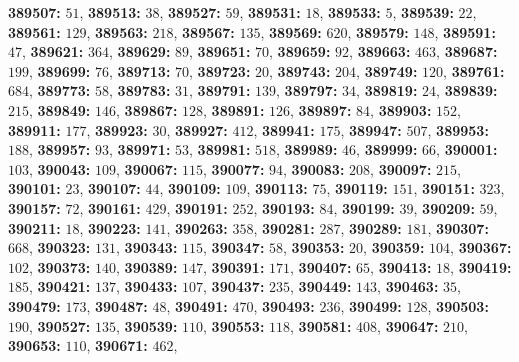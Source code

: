 \textsf{\bfseries 389507:} $51$, \textsf{\bfseries 389513:} $38$, \textsf{\bfseries 389527:} $59$, \textsf{\bfseries 389531:} $18$, \textsf{\bfseries 389533:} $5$, \textsf{\bfseries 389539:} $22$, \textsf{\bfseries 389561:} $129$, \textsf{\bfseries 389563:} $218$, \textsf{\bfseries 389567:} $135$, \textsf{\bfseries 389569:} $620$, \textsf{\bfseries 389579:} $148$, \textsf{\bfseries 389591:} $47$, \textsf{\bfseries 389621:} $364$, \textsf{\bfseries 389629:} $89$, \textsf{\bfseries 389651:} $70$, \textsf{\bfseries 389659:} $92$, \textsf{\bfseries 389663:} $463$, \textsf{\bfseries 389687:} $199$, \textsf{\bfseries 389699:} $76$, \textsf{\bfseries 389713:} $70$, \textsf{\bfseries 389723:} $20$, \textsf{\bfseries 389743:} $204$, \textsf{\bfseries 389749:} $120$, \textsf{\bfseries 389761:} $684$, \textsf{\bfseries 389773:} $58$, \textsf{\bfseries 389783:} $31$, \textsf{\bfseries 389791:} $139$, \textsf{\bfseries 389797:} $34$, \textsf{\bfseries 389819:} $24$, \textsf{\bfseries 389839:} $215$, \textsf{\bfseries 389849:} $146$, \textsf{\bfseries 389867:} $128$, \textsf{\bfseries 389891:} $126$, \textsf{\bfseries 389897:} $84$, \textsf{\bfseries 389903:} $152$, \textsf{\bfseries 389911:} $177$, \textsf{\bfseries 389923:} $30$, \textsf{\bfseries 389927:} $412$, \textsf{\bfseries 389941:} $175$, \textsf{\bfseries 389947:} $507$, \textsf{\bfseries 389953:} $188$, \textsf{\bfseries 389957:} $93$, \textsf{\bfseries 389971:} $53$, \textsf{\bfseries 389981:} $518$, \textsf{\bfseries 389989:} $46$, \textsf{\bfseries 389999:} $66$, \textsf{\bfseries 390001:} $103$, \textsf{\bfseries 390043:} $109$, \textsf{\bfseries 390067:} $115$, \textsf{\bfseries 390077:} $94$, \textsf{\bfseries 390083:} $208$, \textsf{\bfseries 390097:} $215$, \textsf{\bfseries 390101:} $23$, \textsf{\bfseries 390107:} $44$, \textsf{\bfseries 390109:} $109$, \textsf{\bfseries 390113:} $75$, \textsf{\bfseries 390119:} $151$, \textsf{\bfseries 390151:} $323$, \textsf{\bfseries 390157:} $72$, \textsf{\bfseries 390161:} $429$, \textsf{\bfseries 390191:} $252$, \textsf{\bfseries 390193:} $84$, \textsf{\bfseries 390199:} $39$, \textsf{\bfseries 390209:} $59$, \textsf{\bfseries 390211:} $18$, \textsf{\bfseries 390223:} $141$, \textsf{\bfseries 390263:} $358$, \textsf{\bfseries 390281:} $287$, \textsf{\bfseries 390289:} $181$, \textsf{\bfseries 390307:} $668$, \textsf{\bfseries 390323:} $131$, \textsf{\bfseries 390343:} $115$, \textsf{\bfseries 390347:} $58$, \textsf{\bfseries 390353:} $20$, \textsf{\bfseries 390359:} $104$, \textsf{\bfseries 390367:} $102$, \textsf{\bfseries 390373:} $140$, \textsf{\bfseries 390389:} $147$, \textsf{\bfseries 390391:} $171$, \textsf{\bfseries 390407:} $65$, \textsf{\bfseries 390413:} $18$, \textsf{\bfseries 390419:} $185$, \textsf{\bfseries 390421:} $137$, \textsf{\bfseries 390433:} $107$, \textsf{\bfseries 390437:} $235$, \textsf{\bfseries 390449:} $143$, \textsf{\bfseries 390463:} $35$, \textsf{\bfseries 390479:} $173$, \textsf{\bfseries 390487:} $48$, \textsf{\bfseries 390491:} $470$, \textsf{\bfseries 390493:} $236$, \textsf{\bfseries 390499:} $128$, \textsf{\bfseries 390503:} $190$, \textsf{\bfseries 390527:} $135$, \textsf{\bfseries 390539:} $110$, \textsf{\bfseries 390553:} $118$, \textsf{\bfseries 390581:} $408$, \textsf{\bfseries 390647:} $210$, \textsf{\bfseries 390653:} $110$, \textsf{\bfseries 390671:} $462$, 
